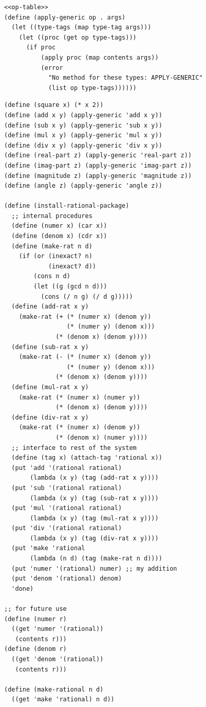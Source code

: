 \documentclass[final,fleqn,titlepage,twoside]{article}
\begin{document}
\begin{verbatim}
<<op-table>>
(define (apply-generic op . args)
  (let ((type-tags (map type-tag args)))
    (let ((proc (get op type-tags)))
      (if proc
          (apply proc (map contents args))
          (error
            "No method for these types: APPLY-GENERIC"
            (list op type-tags))))))
\end{verbatim}
\begin{verbatim}
(define (square x) (* x 2))
(define (add x y) (apply-generic 'add x y))
(define (sub x y) (apply-generic 'sub x y))
(define (mul x y) (apply-generic 'mul x y))
(define (div x y) (apply-generic 'div x y))
(define (real-part z) (apply-generic 'real-part z))
(define (imag-part z) (apply-generic 'imag-part z))
(define (magnitude z) (apply-generic 'magnitude z))
(define (angle z) (apply-generic 'angle z))

(define (install-rational-package)
  ;; internal procedures
  (define (numer x) (car x))
  (define (denom x) (cdr x))
  (define (make-rat n d)
    (if (or (inexact? n)
            (inexact? d))
        (cons n d)
        (let ((g (gcd n d)))
          (cons (/ n g) (/ d g)))))
  (define (add-rat x y)
    (make-rat (+ (* (numer x) (denom y))
                 (* (numer y) (denom x)))
              (* (denom x) (denom y))))
  (define (sub-rat x y)
    (make-rat (- (* (numer x) (denom y))
                 (* (numer y) (denom x)))
              (* (denom x) (denom y))))
  (define (mul-rat x y)
    (make-rat (* (numer x) (numer y))
              (* (denom x) (denom y))))
  (define (div-rat x y)
    (make-rat (* (numer x) (denom y))
              (* (denom x) (numer y))))
  ;; interface to rest of the system
  (define (tag x) (attach-tag 'rational x))
  (put 'add '(rational rational)
       (lambda (x y) (tag (add-rat x y))))
  (put 'sub '(rational rational)
       (lambda (x y) (tag (sub-rat x y))))
  (put 'mul '(rational rational)
       (lambda (x y) (tag (mul-rat x y))))
  (put 'div '(rational rational)
       (lambda (x y) (tag (div-rat x y))))
  (put 'make 'rational
       (lambda (n d) (tag (make-rat n d))))
  (put 'numer '(rational) numer) ;; my addition
  (put 'denom '(rational) denom)
  'done)

;; for future use
(define (numer r)
  ((get 'numer '(rational))
   (contents r)))
(define (denom r)
  ((get 'denom '(rational))
   (contents r)))

(define (make-rational n d)
  ((get 'make 'rational) n d))


\end{verbatim}
\end{document}
